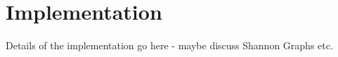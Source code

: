 \chapter{Implementation}\label{ch:implementation}

Details of the implementation go here - maybe discuss Shannon Graphs etc.

